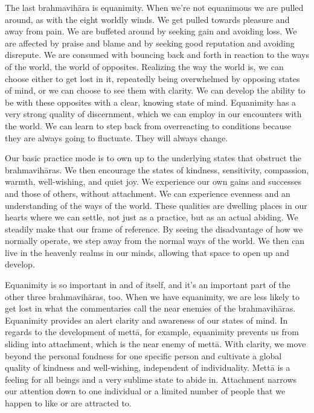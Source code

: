 The last brahmavihāra is equanimity. When we're not equanimous we are pulled around, as with the eight worldly winds. We get pulled towards pleasure and away from pain. We are buffeted around by seeking gain and avoiding \linebreak loss. We are affected by praise and blame and by seeking good reputation and avoiding disrepute. We are consumed with bouncing back and forth in reaction to the ways of the world, the world of opposites. Realizing the way the world is, we can choose either to get lost in it, repeatedly being overwhelmed by opposing states of mind, or we can choose to see them with clarity. We can develop the ability to be with these opposites with a clear, knowing state of mind. Equanimity has a very strong quality of discernment, which we can employ in our encounters with the world. We can learn to step back from overreacting to conditions because they are always going to fluctuate. They will always change.

Our basic practice mode is to own up to the underlying states that obstruct the brahmavihāras. We then encourage the states of kindness, sensitivity, compassion, warmth, well-wishing, and quiet joy. We experience our own gains and successes and those of others, without attachment. We can experience evenness and an understanding of the ways of the world. These qualities are dwelling places in our hearts where we can settle, not just as a practice, but as an actual abiding. We steadily make that our frame of reference. By seeing the disadvantage of how we normally operate, we step away from the normal ways of the world. We then can live in the heavenly realms in our minds, allowing that space to open up and develop.

Equanimity is so important in and of itself, and it's an important part of the other three brahmavihāras, too. When we have equanimity, we are less likely to get lost in what the commentaries call the near enemies of the brahmavihāras. Equanimity provides an alert clarity and awareness of our states of mind. In regards to the development of mettā, for example, equanimity prevents us from sliding into attachment, which is the near enemy of mettā. With clarity, we move beyond the personal fondness for one specific person and cultivate a global quality of kindness and well-wishing, independent of individuality. Mettā is a feeling for all beings and a very sublime state to abide in. Attachment narrows our attention down to one individual or a limited number of people that we happen to like or are attracted to.

